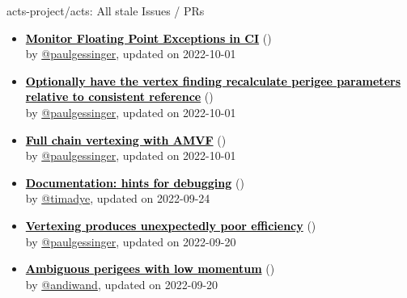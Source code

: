 \begin{frame}[allowframebreaks]{ acts-project/acts: All stale Issues / PRs}
\begin{itemize}
    \item\iss\prstale\textbf{\href{https://github.com/acts-project/acts/issues/1481}{\textcolor{black}{Monitor Floating Point Exceptions in CI}}}
    (\href{https://github.com/acts-project/acts/issues/1481}{}) \\
    by \href{https://github.com/paulgessinger}{@paulgessinger}, updated on 2022-10-01

    \item\iss\prstale\textbf{\href{https://github.com/acts-project/acts/issues/1482}{\textcolor{black}{Optionally have the vertex finding recalculate perigee parameters relative to consistent reference}}}
    (\href{https://github.com/acts-project/acts/issues/1482}{}) \\
    by \href{https://github.com/paulgessinger}{@paulgessinger}, updated on 2022-10-01

    \item\iss\prstale\textbf{\href{https://github.com/acts-project/acts/issues/1406}{\textcolor{black}{Full chain vertexing with AMVF}}}
    (\href{https://github.com/acts-project/acts/issues/1406}{}) \\
    by \href{https://github.com/paulgessinger}{@paulgessinger}, updated on 2022-10-01

    \item\iss\prstale\textbf{\href{https://github.com/acts-project/acts/issues/1463}{\textcolor{black}{Documentation: hints for debugging}}}
    (\href{https://github.com/acts-project/acts/issues/1463}{}) \\
    by \href{https://github.com/timadye}{@timadye}, updated on 2022-09-24

    \item\iss\prstale\textbf{\href{https://github.com/acts-project/acts/issues/1362}{\textcolor{black}{Vertexing produces unexpectedly poor efficiency}}}
    (\href{https://github.com/acts-project/acts/issues/1362}{}) \\
    by \href{https://github.com/paulgessinger}{@paulgessinger}, updated on 2022-09-20

    \item\iss\prstale\textbf{\href{https://github.com/acts-project/acts/issues/1386}{\textcolor{black}{Ambiguous perigees with low momentum}}}
    (\href{https://github.com/acts-project/acts/issues/1386}{}) \\
    by \href{https://github.com/andiwand}{@andiwand}, updated on 2022-09-20


\end{itemize}
\end{frame}
